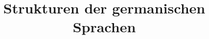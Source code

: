 



\title{Strukturen der germanischen Sprachen}

%
%
%
%
%
%
%
%
%
%

 
\hypersetup{bookmarksopen=false}

\huberlintitlepage






%













